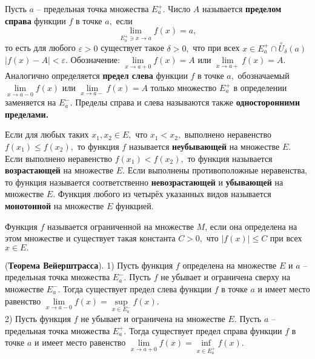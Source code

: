 \begin{definition}
	Пусть $a$ -- предельная точка множества $E^+_a.$
	Число $A$ называется \textbf{пределом справа}
	функции $f$ в точке $a,$ если
	$$
		\lim\limits_{E^+_a\ni x\to a}f(x)=a,
	$$
	то есть для любого
	$\varepsilon>0$ существует такое $\delta>0,$
	что при всех $x \in
		E^+_a\cap\stackrel{\circ}{U}_{\delta}(a)$
	$|f(x)-A|<\varepsilon.$
	Обозначение: $\lim\limits_{x\rightarrow a+0}f(x)=A$
	или $\lim\limits_{x\rightarrow a+}f(x)=A.$
	Аналогично определяется \textbf{предел слева} функции
	$f$ в точке $a,$ обозначаемый
	$\lim\limits_{x\rightarrow a-0}f(x)$
	или $\lim\limits_{x\rightarrow a-}f(x)=A$
	только множество $E^+_a$ в
	определении заменяется на $E^-_a.$
	Пределы справа и слева называются также
	\textbf{односторонними пределами.}
\end{definition}

\begin{definition}
	Если для любых таких $x_1, x_2 \in E,$
	что $x_1<x_2,$ выполнено неравенство
	$f(x_1)\leq f(x_2),$ то функция $f$
	называется \textbf{неубывающей} на множестве
	$E.$ Если выполнено неравенство
	$f(x_1)<f(x_2),$ то функция называется
	\textbf{возрастающей} на множестве $E.$ Если выполнены
	противоположные неравенства, то функция
	называется соответственно \textbf{невозрастающей}
	и \textbf{убывающей} на множестве $E.$
	Функция любого из четырёх
	указанных видов называется \textbf{монотонной}
	на множестве $E$ функцией.
\end{definition}

\begin{definition}
	Функция $f$
	называется ограниченной на множестве $M$,
	если она определена на этом множестве и
	существует такая константа $C>0,$
	что $|f(x)|\leq C$ при всех $x \in E.$
\end{definition}

\begin{theorem} (\textbf{Теорема Вейерштрасса}).
	1) Пусть функция $f$ определена на множестве $E$
	и $a$ -- предельная точка
	множества $E^-_a.$
	Пусть $f$ не убывает и ограничена сверху
	на множестве $E^-_a.$ Тогда существует предел слева
	функции $f$ в точке $a$ и имеет место равенство
	$
		\lim\limits_{x\rightarrow a-0}f(x)=
		\sup\limits_{x \in E^-_a}f(x).
	$\\
	2) Пусть функция $f$ не убывает и ограничена
	на множестве $E.$ Пусть $a$ -- предельная точка
	множества $E^+_a.$ Тогда существует предел справа
	функции $f$ в точке $a$ и имеет место равенство
	$
		\lim\limits_{x\rightarrow a+0}f(x)=
		\inf\limits_{x \in E^+_a}f(x).
	$
\end{theorem}

